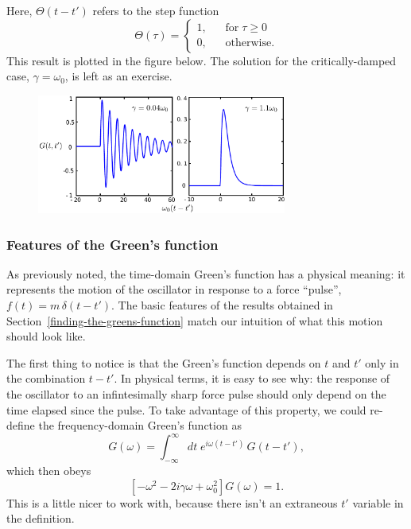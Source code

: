\documentclass[10pt,a4paper]{article}
\begin{document}
Here, $\Theta(t-t')$ refers to the step function
\begin{equation}
\Theta(\tau) = \left\{\begin{array}{ll} 1, &\;\;\;\textrm{for} \; \tau \ge 0\\ 0,&\;\;\; \textrm{otherwise.}\end{array}\right.
\end{equation}
This result is plotted in the figure below. The solution for the
critically-damped case, $\gamma = \omega_0$, is left as an exercise.

\begin{figure}[h]
  \centering\includegraphics[width=0.73\textwidth]{oscillator_greenfun}
\end{figure}
    
\subsubsection{Features of the Green's function}
\label{features-of-the-greens-function}

As previously noted, the time-domain Green's function has a physical
meaning: it represents the motion of the oscillator in response to a
force ``pulse'', $f(t) = m\, \delta(t-t')$. The basic features of the
results obtained in Section~\ref{finding-the-greens-function} match
our intuition of what this motion should look like.

The first thing to notice is that the Green's function depends on $t$
and $t'$ only in the combination $t-t'$. In physical terms, it is easy
to see why: the response of the oscillator to an infintesimally sharp
force pulse should only depend on the time elapsed since the pulse. To
take advantage of this property, we could re-define the
frequency-domain Green's function as
\begin{equation}
G(\omega) = \int_{-\infty}^\infty dt \; e^{i\omega (t-t')}\, G(t-t'),
\end{equation}
which then obeys
\begin{equation}
\left[- \omega^2 - 2i \gamma\omega + \omega_0^2\right] G(\omega) = 1.
\end{equation}
This is a little nicer to work with, because there isn't an extraneous
$t'$ variable in the definition.
\end{document}
